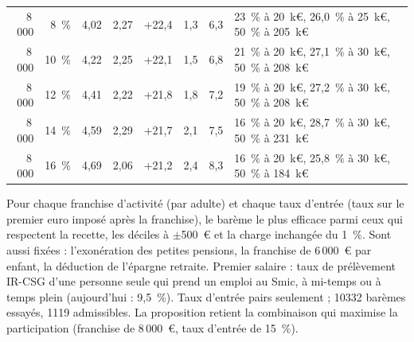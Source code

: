\begin{table}[!htbp]
{\begin{tabular}{@{}rrrrrrrl@{}}
8\,000 & 8~\% & 4,02 & 2,27 & +22,4 & 1,3 & 6,3 & 23~\% à 20~k€, 26,0~\% à 25~k€, 50~\% à 205~k€ \\
8\,000 & 10~\% & 4,22 & 2,25 & +22,1 & 1,5 & 6,8 & 21~\% à 20~k€, 27,1~\% à 30~k€, 50~\% à 208~k€ \\
8\,000 & 12~\% & 4,41 & 2,22 & +21,8 & 1,8 & 7,2 & 19~\% à 20~k€, 27,2~\% à 30~k€, 50~\% à 208~k€ \\
8\,000 & 14~\% & 4,59 & 2,29 & +21,7 & 2,1 & 7,5 & 16~\% à 20~k€, 28,7~\% à 30~k€, 50~\% à 231~k€ \\
8\,000 & 16~\% & 4,69 & 2,06 & +21,2 & 2,4 & 8,3 & 16~\% à 20~k€, 25,8~\% à 30~k€, 50~\% à 184~k€ \\
\bottomrule
\end{tabular}}
\par\vspace{3pt}\parbox{\linewidth}{\raggedright\scriptsize\color{encre}
Pour chaque franchise d'activité (par adulte) et chaque taux d'entrée (taux sur le premier euro imposé après la franchise), le barème le plus efficace parmi ceux qui respectent la recette, les déciles à $\pm$500~€ et la charge inchangée du 1~\%. Sont aussi fixées : l'exonération des petites pensions, la franchise de 6\,000~€ par enfant, la déduction de l'épargne retraite. Premier salaire : taux de prélèvement IR-CSG d'une personne seule qui prend un emploi au Smic, à mi-temps ou à temps plein (aujourd'hui : 9,5~\%). Taux d'entrée pairs seulement ; 10332 barèmes essayés, 1119 admissibles. La proposition retient la combinaison qui maximise la participation (franchise de 8\,000~€, taux d'entrée de 15~\%).}
\end{table}
